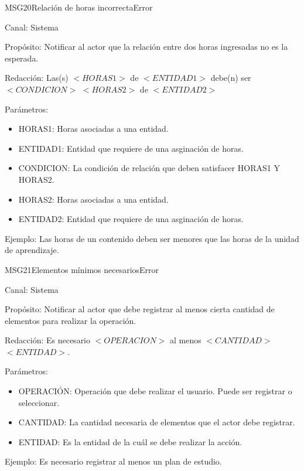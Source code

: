 \begin{mensaje}{MSG20}{Relación de horas incorrecta}{Error}
	\item[Canal:] Sistema
	\item[Propósito:] Notificar al actor que la relación entre dos horas ingresadas no es la esperada.
	\item[Redacción:] Las(s) $<HORAS1>$ de $<ENTIDAD1>$ debe(n) ser $<CONDICION>$ $<HORAS2>$ de $<ENTIDAD2>$
	\item[Parámetros:] 
	\begin{itemize}
		\item HORAS1: Horas asociadas a una entidad.
		\item ENTIDAD1: Entidad que requiere de una asginación de horas.
		\item CONDICION: La condición de relación que deben satisfacer HORAS1 Y HORAS2.
		\item HORAS2: Horas asociadas a una entidad.
		\item ENTIDAD2: Entidad que requiere de una asginación de horas.
	\end{itemize}
	\item[Ejemplo:] Las horas de un contenido deben ser menores que las horas de la unidad de aprendizaje.
	
\end{mensaje}


\begin{mensaje}{MSG21}{Elementos mínimos necesarios}{Error}
	\item[Canal:] Sistema
	\item[Propósito:] Notificar al actor que debe registrar al menos cierta cantidad de elementos para realizar la operación.
	\item[Redacción:] Es necesario $<OPERACION>$ al menos $<CANTIDAD>$ $<ENTIDAD>$.
	\item[Parámetros:] 
	\begin{itemize}
		\item OPERACIÓN: Operación que debe realizar el usuario. Puede ser registrar o seleccionar.
		\item CANTIDAD: La cantidad necesaria de elementos que el actor debe registrar.
		\item ENTIDAD: Es la entidad de la cuál se debe realizar la acción.
	\end{itemize}
	\item[Ejemplo:]  Es necesario registrar al menos un plan de estudio.
	
\end{mensaje}


